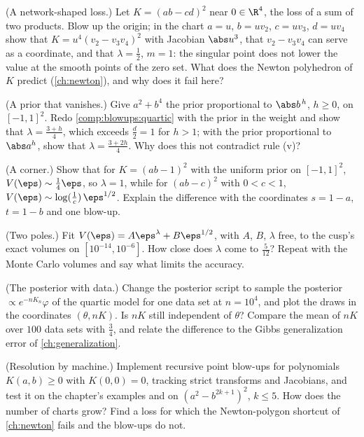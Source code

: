\begin{refsection}
\begin{exercises}
\item \byhand\hard (A network-shaped loss.) Let $K=(ab-cd)^2$ near $0\in\R^4$, the loss of a sum of two products. Blow up the origin; in the chart $a=u$, $b=uv_2$, $c=uv_3$, $d=uv_4$ show that $K=u^4(v_2-v_3v_4)^2$ with Jacobian $\abs u^3$, that $v_2-v_3v_4$ can serve as a coordinate, and that $\lambda=\frac12$, $m=1$: the singular point does not lower the value at the smooth points of the zero set. What does the Newton polyhedron of $K$ predict (\cref{ch:newton}), and why does it fail here? \label{ex:blowups:fourvars}

\item \variation (A prior that vanishes.)\label{ex:blowups:prior} Give $a^2+b^4$ the prior proportional to $\abs b^{\,h}$, $h\ge0$, on $[-1,1]^2$. Redo \cref{comp:blowups:quartic} with the prior in the weight and show that $\lambda=\frac{3+h}4$, which exceeds $\frac d2=1$ for $h>1$; with the prior proportional to $\abs a^h$, show that $\lambda=\frac{3+2h}4$. Why does this not contradict rule (v)?

\item \variation (A corner.)\label{ex:blowups:corner} Show that for $K=(ab-1)^2$ with the uniform prior on $[-1,1]^2$, $V(\eps)\sim\frac14\eps$, so $\lambda=1$, while for $(ab-c)^2$ with $0<c<1$, $V(\eps)\sim\log(\frac1c)\,\eps^{1/2}$. Explain the difference with the coordinates $s=1-a$, $t=1-b$ and one blow-up.

\item \measurement (Two poles.) Fit $V(\eps)=A\eps^\lambda+B\eps^{1/2}$, with $A$, $B$, $\lambda$ free, to the cusp's exact volumes on $[10^{-14},10^{-6}]$. How close does $\lambda$ come to $\frac5{12}$? Repeat with the Monte Carlo volumes and say what limits the accuracy.\label{ex:blowups:twopoles}

\item \measurement (The posterior with data.) Change the posterior script to sample the posterior $\propto e^{-nK_n}\varphi$ of the quartic model for one data set at $n=10^4$, and plot the draws in the coordinates $(\theta,nK)$. Is $nK$ still independent of $\theta$? Compare the mean of $nK$ over $100$ data sets with $\frac34$, and relate the difference to the Gibbs generalization error of \cref{ch:generalization}.\label{ex:blowups:data}

\item \research (Resolution by machine.) Implement recursive point blow-ups for polynomials $K(a,b)\ge0$ with $K(0,0)=0$, tracking strict transforms and Jacobians, and test it on the chapter's examples and on $(a^2-b^{2k+1})^2$, $k\le5$. How does the number of charts grow? Find a loss for which the Newton-polygon shortcut of \cref{ch:newton} fails and the blow-ups do not.\label{ex:blowups:machine}
\end{exercises}


\end{refsection}
